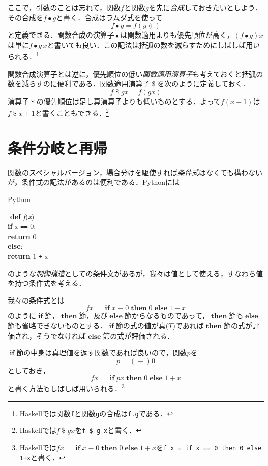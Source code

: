 \documentclass[twocolumn]{jsbook}
\newcommand{\keyword}[1]{{\emph{#1}}}
\newcommand{\code}[1]{\texttt{#1}}
\newenvironment{pythoncode}{\begin{itembox}[r]{Python}}{\end{itembox}}
\newenvironment{python}{\begin{tabbing}\hspace*{1em}\=\hspace*{1em}\=\hspace*{1em}\=\hspace*{1em}\=\kill}{\end{tabbing}}
\newcommand{\pthnId}[1]{\textit{#1}}
\newcommand{\pthnKeyword}[1]{\textbf{#1}}
\newcommand{\pthnOp}[1]{\texttt{#1}}
\newcommand{\mathKeyword}[1]{\mathbf{#1}}
\DeclareMathOperator{\mathApply}{\$}
\DeclareMathOperator{\mathCompose}{\bullet}
\DeclareMathOperator{\mathIf}{\mathKeyword{if}}
\DeclareMathOperator{\mathElse}{\mathKeyword{else}}
\DeclareMathOperator{\mathThen}{\mathKeyword{then}}
\newcommand{\mathLambdaAnonymousParameter}{\lozenge}
\begin{document}
ここで，引数のことは忘れて，関数$f$と関数$g$を先に\keyword{合成}しておきたいとしよう．その合成を$f\mathCompose g$と書く．合成はラムダ式を使って$$f\mathCompose g=f(g\mathLambdaAnonymousParameter)$$と定義できる．関数合成の演算子$\mathCompose$は関数適用よりも優先順位が高く，$(f\mathCompose g)x$は単に$f\mathCompose g\,x$と書いても良い．この記法は括弧の数を減らすためにしばしば用いられる．\footnote{Haskellでは関数\code{f}と関数\code{g}の合成は\code{f.g}である．}

関数合成演算子とは逆に，優先順位の低い\keyword{関数適用演算子}も考えておくと括弧の数を減らすのに便利である．関数適用演算子$\mathApply$を次のように定義しておく．$$f\mathApply gx=f(gx)$$演算子$\mathApply$の優先順位は足し算演算子よりも低いものとする．よって$f(x+1)$は$f\mathApply x+1$と書くこともできる．\footnote{Haskellでは$f\mathApply gx$を\code{f \$ g x}と書く．}

\section{条件分岐と再帰}

関数のスペシャルバージョン，場合分けを駆使すれば\keyword{条件式}はなくても構わないが，条件式の記法があるのは便利である．Pythonには
\begin{pythoncode}
\begin{python}
\pthnKeyword{def} \pthnId{f}(\pthnId{x})\\
\>\pthnKeyword{if} \pthnId{x} \pthnOp{==} $0$:\\
\>\>\pthnKeyword{return} $0$\\
\>\pthnKeyword{else}:\\
\>\>\pthnKeyword{return} $1$ \pthnOp{+} \pthnId{x}
\end{python}
\end{pythoncode}
のような\keyword{制御構造}としての条件文があるが，我々は値として使える，すなわち値を持つ条件式を考える．

我々の条件式とは$$fx=\mathIf x\equiv0\mathThen0\mathElse1+x$$のように$\mathIf$節，$\mathThen$節，及び$\mathElse$節からなるものであって，$\mathThen$節も$\mathElse$節も省略できないものとする．$\mathIf$節の式の値が真($T$)であれば$\mathThen$節の式が評価され，そうでなければ$\mathElse$節の式が評価される．

$\mathIf$節の中身は真理値を返す関数であれば良いので，関数$p$を$$p=(\equiv)0$$としておき，$$fx=\mathIf px\mathThen0\mathElse1+x$$と書く方法もしばしば用いられる．\footnote{Haskellでは$fx=\mathIf x\equiv0\mathThen0\mathElse1+x$を\code{f x = if x == 0 then 0 else 1+x}と書く．}
\end{document}
